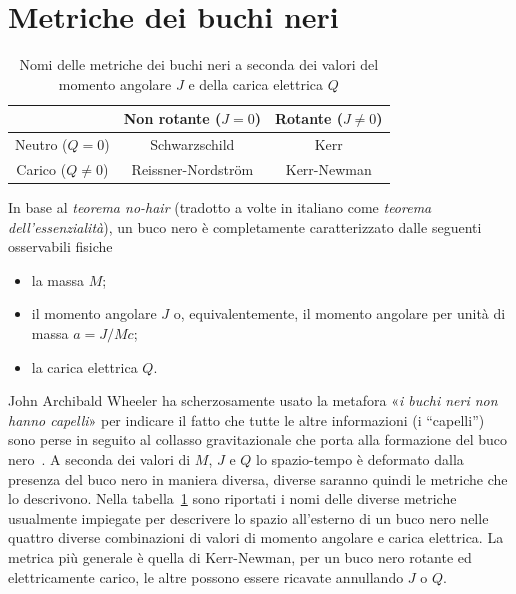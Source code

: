\section{Metriche dei buchi neri}
\label{sec:metriche-buchi-neri}

\begin{table}
  \centering
  \caption{Nomi delle metriche dei buchi neri a seconda dei valori del momento
    angolare \(J\) e della carica elettrica \(Q\)}
  \label{tab:metriche-buchi-neri}
  \begin{tabular}{ccc}
    \toprule
                          & Non rotante (\(J = 0\)) & Rotante (\(J \neq 0\)) \\
    \midrule
    Neutro (\(Q = 0\))    & Schwarzschild           & Kerr                   \\
    Carico (\(Q \neq 0\)) & Reissner-Nordström      & Kerr-Newman            \\
    \bottomrule
  \end{tabular}
\end{table}

In base al \emph{teorema no-hair} (tradotto a volte in italiano come
\emph{teorema dell'essenzialità}), un buco nero è completamente caratterizzato
dalle seguenti osservabili fisiche
\begin{itemize}
\item la massa \(M\);
\item il momento angolare \(J\) o, equivalentemente, il momento angolare per
  unità di massa \(a = J/Mc\);
\item la carica elettrica \(Q\).
\end{itemize}
John Archibald Wheeler ha scherzosamente usato la metafora «\emph{i buchi neri
  non hanno capelli}» per indicare il fatto che tutte le altre informazioni (i
``capelli'') sono perse in seguito al collasso gravitazionale che porta alla
formazione del buco nero~\parencite[875-876]{misner:gravitation}.  A seconda dei
valori di \(M\), \(J\) e \(Q\) lo spazio-tempo è deformato dalla presenza del
buco nero in maniera diversa, diverse saranno quindi le metriche che lo
descrivono.  Nella tabella~\ref{tab:metriche-buchi-neri} sono riportati i nomi
delle diverse metriche usualmente impiegate per descrivere lo spazio all'esterno
di un buco nero nelle quattro diverse combinazioni di valori di momento angolare
e carica elettrica.  La metrica più generale è quella di Kerr-Newman, per un
buco nero rotante ed elettricamente carico, le altre possono essere ricavate
annullando \(J\) o \(Q\).

